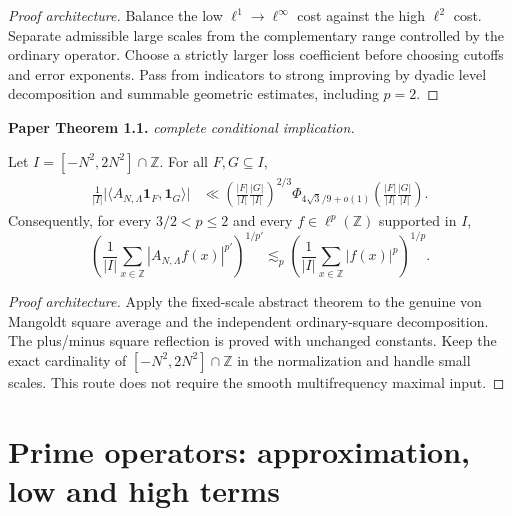\begin{proof}[Proof architecture]
\uses{}
\leanok
Balance the low $\ell^1\!\to\!\ell^\infty$ cost against the high $\ell^2$ cost. Separate admissible large scales from the complementary range controlled by the ordinary operator. Choose a strictly larger loss coefficient before choosing cutoffs and error exponents. Pass from indicators to strong improving by dyadic level decomposition and summable geometric estimates, including $p=2$.
\end{proof}

\begin{theorem}
\label{prime_improving}
\leanok
\par\medskip\noindent\textbf{Paper Theorem 1.1.} \textit{complete conditional implication.}\par
Let \(I=[-N^2,2N^2]\cap\mathbb Z\).  For all \(F,G\subseteq I\),
\begin{align}
 \frac1{|I|}
 \bigl|\langle A_{N,\Lambda}\mathbf1_F,\mathbf1_G\rangle\bigr|
 &\ll
 \left(\frac{|F|}{|I|}\frac{|G|}{|I|}\right)^{2/3}
 \Phi_{4\sqrt3/9+o(1)}
 \left(\frac{|F|}{|I|}\frac{|G|}{|I|}\right).
\end{align}
Consequently, for every \(3/2<p\leq2\) and every
\(f\in\ell^p(\mathbb Z)\) supported in $I$,
\[
 \left(\frac1{|I|}\sum_{x\in\mathbb Z}
 |A_{N,\Lambda}f(x)|^{p'}\right)^{1/p'}
 \lesssim_p
 \left(\frac1{|I|}\sum_{x\in\mathbb Z}|f(x)|^p\right)^{1/p}.
\]
\end{theorem}
\begin{proof}[Proof architecture]
\leanok
Apply the fixed-scale abstract theorem to the genuine von Mangoldt square average and the independent ordinary-square decomposition. The plus/minus square reflection is proved with unchanged constants. Keep the exact cardinality of $[-N^2,2N^2]\cap\mathbb Z$ in the normalization and handle small scales. This route does not require the smooth multifrequency maximal input.
\end{proof}

\section{Prime operators: approximation, low and high terms}

